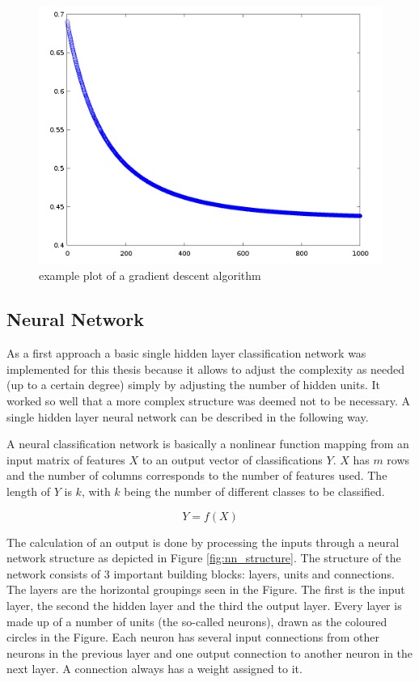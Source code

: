\begin{figure}[H]
\centering
\includegraphics[width=0.8\linewidth]{include/images/plot_cost_function_over_iter.png}
\caption{example plot of a gradient descent algorithm}
\label{fig:plot_cost_function_over_iter}
\end{figure}


\subsection{Neural Network}
As a first approach a basic single hidden layer classification network was implemented for this thesis because it allows to adjust the complexity as needed (up to a certain degree) simply by adjusting the number of hidden units. It worked so well that a more complex structure was deemed not to be necessary. A single hidden layer neural network can be described in the following way.

A neural classification network is basically a nonlinear function mapping from an input matrix of features $X$ to an output vector of classifications $Y$. $X$ has $m$ rows and the number of columns corresponds to the number of features used. The length of $Y$ is $k$, with $k$ being the number of different classes to be classified.

\begin{equation}
    Y = f(X)
\end{equation}

The calculation of an output is done by processing the inputs through a neural network structure as depicted in Figure \ref{fig:nn_structure}. The structure of the network consists of 3 important building blocks: layers, units and connections. The layers are the horizontal groupings seen in the Figure. The first is the input layer, the second the hidden layer and the third the output layer. Every layer is made up of a number of units (the so-called neurons), drawn as the coloured circles in the Figure. Each neuron has several input connections from other neurons in the previous layer and one output connection to another neuron in the next layer. A connection always has a weight assigned to it. 

